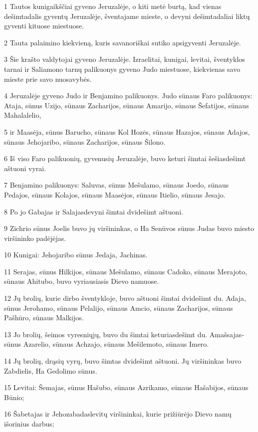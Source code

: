 \par 1 Tautos kunigaikščiai gyveno Jeruzalėje, o kiti metė burtą, kad vienas dešimtadalis gyventų Jeruzalėje, šventajame mieste, o devyni dešimtadaliai liktų gyventi kituose miestuose. 
\par 2 Tauta palaimino kiekvieną, kuris savanoriškai sutiko apsigyventi Jeruzalėje. 
\par 3 Šie krašto valdytojai gyveno Jeruzalėje. Izraelitai, kunigai, levitai, šventyklos tarnai ir Saliamono tarnų palikuonys gyveno Judo miestuose, kiekvienas savo mieste prie savo nuosavybės. 
\par 4 Jeruzalėje gyveno Judo ir Benjamino palikuonys. Judo sūnaus Faro palikuonys: Ataja, sūnus Uzijo, sūnaus Zacharijos, sūnaus Amarijo, sūnaus Šefatijos, sūnaus Mahalalelio, 
\par 5 ir Maasėja, sūnus Barucho, sūnaus Kol Hozės, sūnaus Hazajos, sūnaus Adajos, sūnaus Jehojaribo, sūnaus Zacharijos, sūnaus Šilono. 
\par 6 Iš viso Faro palikuonių, gyvenusių Jeruzalėje, buvo keturi šimtai šešiasdešimt aštuoni vyrai. 
\par 7 Benjamino palikuonys: Saluvas, sūnus Mešulamo, sūnaus Joedo, sūnaus Pedajos, sūnaus Kolajos, sūnaus Maasėjos, sūnaus Itielio, sūnaus Jesajo. 
\par 8 Po jo Gabajas ir Salajas­devyni šimtai dvidešimt aštuoni. 
\par 9 Zichrio sūnus Joelis buvo jų viršininkas, o Ha Senūvos sūnus Judas buvo miesto viršininko padėjėjas. 
\par 10 Kunigai: Jehojaribo sūnus Jedaja, Jachinas. 
\par 11 Serajas, sūnus Hilkijos, sūnaus Mešulamo, sūnaus Cadoko, sūnaus Merajoto, sūnaus Ahitubo, buvo vyriausiasis Dievo namuose. 
\par 12 Jų brolių, kurie dirbo šventykloje, buvo aštuoni šimtai dvidešimt du. Adaja, sūnus Jerohamo, sūnaus Pelalijo, sūnaus Amcio, sūnaus Zacharijos, sūnaus Pašhūro, sūnaus Malkijos. 
\par 13 Jo brolių, šeimos vyresniųjų, buvo du šimtai keturiasdešimt du. Amašsajas­sūnus Azarelio, sūnaus Achzajo, sūnaus Mešilemoto, sūnaus Imero. 
\par 14 Jų brolių, drąsių vyrų, buvo šimtas dvidešimt aštuoni. Jų viršininkas buvo Zabdielis, Ha Gedolimo sūnus. 
\par 15 Levitai: Šemajas, sūnus Hašubo, sūnaus Azrikamo, sūnaus Hašabijos, sūnaus Būnio; 
\par 16 Šabetajas ir Jehozabadas­levitų viršininkai, kurie prižiūrėjo Dievo namų išorinius darbus; 
